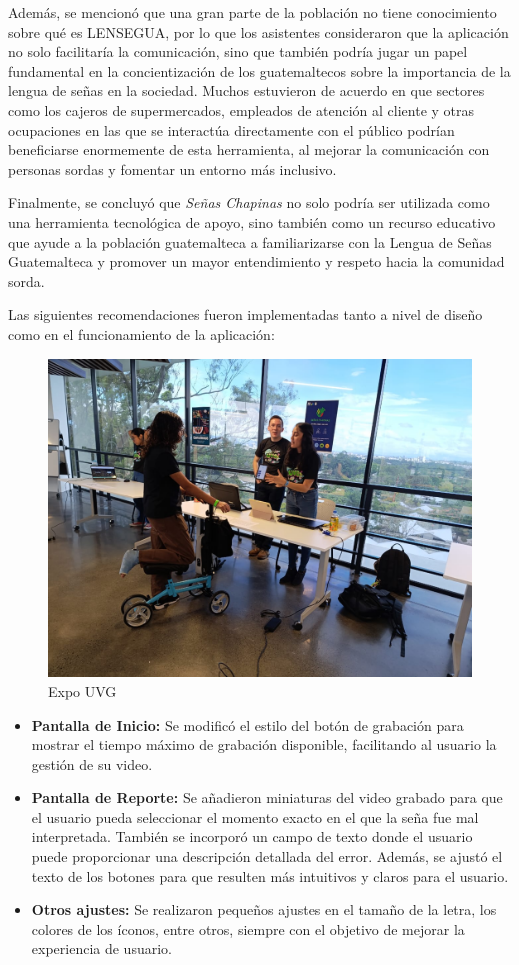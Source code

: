 Además, se mencionó que una gran parte de la población no tiene conocimiento sobre qué es LENSEGUA, por lo que los asistentes consideraron que la aplicación no solo facilitaría la comunicación, sino que también podría jugar un papel fundamental en la concientización de los guatemaltecos sobre la importancia de la lengua de señas en la sociedad. Muchos estuvieron de acuerdo en que sectores como los cajeros de supermercados, empleados de atención al cliente y otras ocupaciones en las que se interactúa directamente con el público podrían beneficiarse enormemente de esta herramienta, al mejorar la comunicación con personas sordas y fomentar un entorno más inclusivo.

Finalmente, se concluyó que \textit{Señas Chapinas} no solo podría ser utilizada como una herramienta tecnológica de apoyo, sino también como un recurso educativo que ayude a la población guatemalteca a familiarizarse con la Lengua de Señas Guatemalteca y promover un mayor entendimiento y respeto hacia la comunidad sorda.

Las siguientes recomendaciones fueron implementadas tanto a nivel de diseño como en el funcionamiento de la aplicación:

\begin{figure} [H]
    \centering
    \includegraphics[width=0.5\linewidth]{figuras/expo.jpeg}
    \caption{Expo UVG}
    \label{fig:enter-label}
\end{figure}

\begin{itemize}
    \item \textbf{Pantalla de Inicio:} Se modificó el estilo del botón de grabación para mostrar el tiempo máximo de grabación disponible, facilitando al usuario la gestión de su video.
    
    \item \textbf{Pantalla de Reporte:} Se añadieron miniaturas del video grabado para que el usuario pueda seleccionar el momento exacto en el que la seña fue mal interpretada. También se incorporó un campo de texto donde el usuario puede proporcionar una descripción detallada del error. Además, se ajustó el texto de los botones para que resulten más intuitivos y claros para el usuario.
    
    \item \textbf{Otros ajustes:} Se realizaron pequeños ajustes en el tamaño de la letra, los colores de los íconos, entre otros, siempre con el objetivo de mejorar la experiencia de usuario.
\end{itemize}

